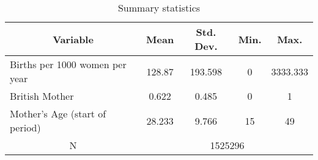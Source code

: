 
\begin{table}[htbp]\centering \caption{Summary statistics \label{sumstat}}
\begin{tabular}{l c c c c }\hline\hline
\multicolumn{1}{c}{\textbf{Variable}} & \textbf{Mean}
 & \textbf{Std. Dev.}& \textbf{Min.} &  \textbf{Max.} \\ \hline
Births per 1000 women per year & 128.87 & 193.598 & 0 & 3333.333 \\
British Mother & 0.622 & 0.485 & 0 & 1 \\
Mother's Age (start of period) & 28.233 & 9.766 & 15 & 49 \\
\multicolumn{1}{c}{N} & \multicolumn{4}{c}{1525296}\\ \hline\end{tabular}
\end{table}
